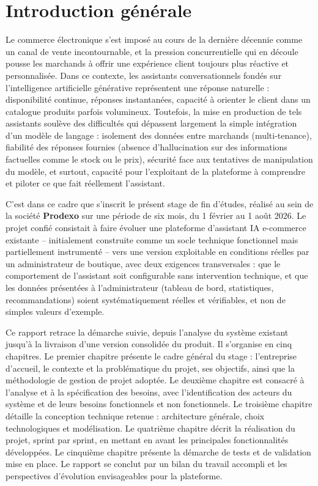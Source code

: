 \chapter*{Introduction générale}

Le commerce électronique s'est imposé au cours de la dernière décennie comme un canal de vente incontournable, et la pression concurrentielle qui en découle pousse les marchands à offrir une expérience client toujours plus réactive et personnalisée. Dans ce contexte, les assistants conversationnels fondés sur l'intelligence artificielle générative représentent une réponse naturelle : disponibilité continue, réponses instantanées, capacité à orienter le client dans un catalogue produits parfois volumineux. Toutefois, la mise en production de tels assistants soulève des difficultés qui dépassent largement la simple intégration d'un modèle de langage : isolement des données entre marchands (multi-tenance), fiabilité des réponses fournies (absence d'hallucination sur des informations factuelles comme le stock ou le prix), sécurité face aux tentatives de manipulation du modèle, et surtout, capacité pour l'exploitant de la plateforme à comprendre et piloter ce que fait réellement l'assistant.

C'est dans ce cadre que s'inscrit le présent stage de fin d'études, réalisé au sein de la société \textbf{Prodexo} sur une période de six mois, du 1 février au 1 août 2026. Le projet confié consistait à faire évoluer une plateforme d'assistant IA e-commerce existante -- initialement construite comme un socle technique fonctionnel mais partiellement instrumenté -- vers une version exploitable en conditions réelles par un administrateur de boutique, avec deux exigences transversales : que le comportement de l'assistant soit configurable sans intervention technique, et que les données présentées à l'administrateur (tableau de bord, statistiques, recommandations) soient systématiquement réelles et vérifiables, et non de simples valeurs d'exemple.

Ce rapport retrace la démarche suivie, depuis l'analyse du système existant jusqu'à la livraison d'une version consolidée du produit. Il s'organise en cinq chapitres. Le premier chapitre présente le cadre général du stage : l'entreprise d'accueil, le contexte et la problématique du projet, ses objectifs, ainsi que la méthodologie de gestion de projet adoptée. Le deuxième chapitre est consacré à l'analyse et à la spécification des besoins, avec l'identification des acteurs du système et de leurs besoins fonctionnels et non fonctionnels. Le troisième chapitre détaille la conception technique retenue : architecture générale, choix technologiques et modélisation. Le quatrième chapitre décrit la réalisation du projet, sprint par sprint, en mettant en avant les principales fonctionnalités développées. Le cinquième chapitre présente la démarche de tests et de validation mise en place. Le rapport se conclut par un bilan du travail accompli et les perspectives d'évolution envisageables pour la plateforme.

